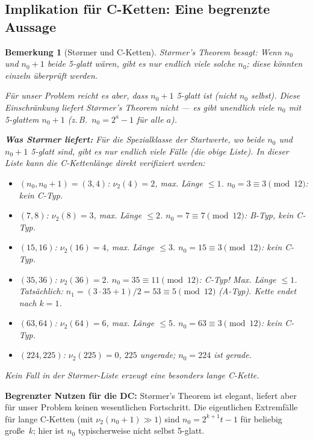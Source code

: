 \documentclass[12pt,a4paper]{article}
\newtheorem{bemerkung}[definition]{Bemerkung}
\newcommand{\vii}{\nu_2}
\begin{document}
\subsection{Implikation für C-Ketten: Eine begrenzte Aussage}

\begin{bemerkung}[Størmer und C-Ketten]
\label{bem:stoermer}
Størmer's Theorem besagt: Wenn $n_0$ \emph{und} $n_0+1$ beide 5-glatt wären,
gibt es nur endlich viele solche $n_0$; diese könnten einzeln überprüft werden.

Für unser Problem reicht es aber, dass $n_0+1$ 5-glatt ist (nicht $n_0$ selbst).
Diese Einschränkung liefert Størmer's Theorem nicht --- es gibt unendlich
viele $n_0$ mit 5-glattem $n_0+1$ (z.\,B.\ $n_0 = 2^a - 1$ für alle $a$).

\textbf{Was Størmer liefert:} Für die Spezialklasse der Startwerte, wo
\emph{beide} $n_0$ und $n_0+1$ 5-glatt sind, gibt es nur endlich viele
Fälle (die obige Liste). In dieser Liste kann die C-Kettenlänge direkt
verifiziert werden:
\begin{itemize}
  \item $(n_0, n_0+1) = (3, 4)$: $\vii(4) = 2$, max. Länge $\leq 1$. $n_0 = 3 \equiv 3 \pmod{12}$: kein C-Typ.
  \item $(7, 8)$: $\vii(8) = 3$, max. Länge $\leq 2$. $n_0 = 7 \equiv 7 \pmod{12}$: B-Typ, kein C-Typ.
  \item $(15, 16)$: $\vii(16) = 4$, max. Länge $\leq 3$. $n_0 = 15 \equiv 3 \pmod{12}$: kein C-Typ.
  \item $(35, 36)$: $\vii(36) = 2$. $n_0 = 35 \equiv 11 \pmod{12}$: C-Typ! Max. Länge $\leq 1$. Tatsächlich: $n_1 = (3\cdot35+1)/2 = 53 \equiv 5 \pmod{12}$ (A-Typ). Kette endet nach $k=1$. \checkmark
  \item $(63, 64)$: $\vii(64) = 6$, max. Länge $\leq 5$. $n_0 = 63 \equiv 3 \pmod{12}$: kein C-Typ.
  \item $(224, 225)$: $\vii(225) = 0$, $225$ ungerade; $n_0 = 224$ ist gerade.
\end{itemize}
Kein Fall in der Størmer-Liste erzeugt eine besonders lange C-Kette.
\end{bemerkung}

\begin{tcolorbox}[warnung]
\textbf{Begrenzter Nutzen für die DC:}
Størmer's Theorem ist elegant, liefert aber für unser Problem keinen
wesentlichen Fortschritt. Die eigentlichen Extremfälle für lange C-Ketten
(mit $\vii(n_0+1) \gg 1$) sind $n_0 = 2^{k+1}t - 1$ für beliebig große~$k$;
hier ist $n_0$ typischerweise nicht selbst 5-glatt.
\end{tcolorbox}
\end{document}
